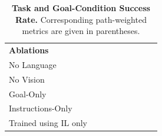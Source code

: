 \documentclass[11pt,a4paper]{article}
\begin{document}
\begin{table}[]
{\begin{tabular}{@{}lllllllll@{}}
\textbf{Ablations} &                          &                               &                          &                               &                          &                               &                          &                               \\
No Language              &                          &                               &                          &                               &                          &                               &                          &                               \\
No Vision                &                          &                               &                          &                               &                          &                               &                          &                               \\
Goal-Only                &                          &                               &                          &                               &                          &                               &                          &                               \\
Instructions-Only        &                          &                               &                          &                               &                          &                               &                          &                               \\
Trained using IL only       &                          &                               &                          &                               &                          &                               &                          &                               \\\bottomrule
\end{tabular}}
\caption{\textbf{Task and Goal-Condition Success Rate.} Corresponding path-weighted metrics are given in parentheses.}
\label{tab:results}
\end{table}
\end{document}
